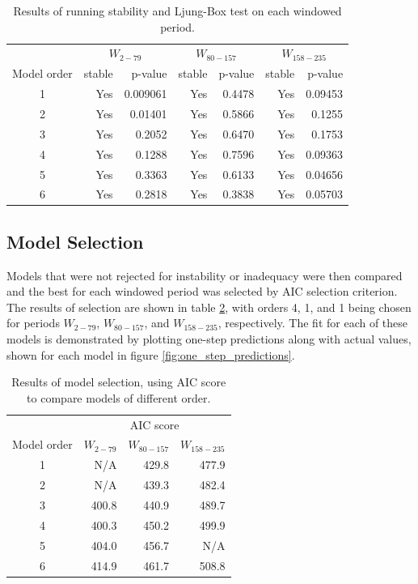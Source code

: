 \documentclass[a4paper]{scrartcl}
\begin{document}
\begin{table}[h!]
  \centering
  \begin{tabular}{ c | r r | r r | r r }
      & \multicolumn{2}{|c|}{$W_{2-79}$} & \multicolumn{2}{|c|}{$W_{80-157}$} & \multicolumn{2}{|c}{$W_{158-235}$} \\
    Model order & stable & p-value & stable & p-value & stable & p-value \\
    \hline
    1 & Yes & 0.009061 & Yes & 0.4478 & Yes & 0.09453 \\
    2 & Yes & 0.01401 & Yes & 0.5866 & Yes & 0.1255 \\
    3 & Yes & 0.2052 & Yes & 0.6470 & Yes & 0.1753 \\
    4 & Yes & 0.1288 & Yes & 0.7596 & Yes & 0.09363 \\ 
    5 & Yes & 0.3363 & Yes & 0.6133 & Yes & 0.04656 \\
    6 & Yes & 0.2818 & Yes & 0.3838 & Yes & 0.05703 \\
    \hline
  \end{tabular}
\caption{Results of running stability and Ljung-Box test on each windowed period.}
\label{tab:diagnostic_results}
\end{table}

\subsection*{Model Selection}
Models that were not rejected for instability or inadequacy were then compared and the best for each windowed period was selected by AIC selection criterion. The results of selection are shown in table \ref{tab:selection_results}, with orders 4, 1, and 1 being chosen for periods $W_{2-79}$, $W_{80-157}$, and $W_{158-235}$, respectively. The fit for each of these models is demonstrated by plotting one-step predictions along with actual values, shown for each model in figure \ref{fig:one_step_predictions}.

\begin{table}[h!]
  \centering
  \begin{tabular}{ c | r | r | r }
    ~ & \multicolumn{3}{|c}{AIC score} \\
    Model order & $W_{2-79}$ & $W_{80-157}$ & $W_{158-235}$ \\
    \hline
    1 & N/A & 429.8 & 477.9 \\
    2 & N/A & 439.3 & 482.4 \\
    3 & 400.8 & 440.9 & 489.7 \\
    4 & 400.3 & 450.2 & 499.9 \\ 
    5 & 404.0 & 456.7 & N/A \\
    6 & 414.9 & 461.7 & 508.8 \\
    \hline
  \end{tabular}
\caption{Results of model selection, using AIC score to compare models of different order.}
\label{tab:selection_results}
\end{table}
\end{document}
